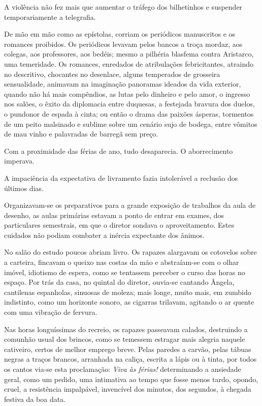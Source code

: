 A violência não fez mais que aumentar o tráfego dos bilhetinhos e
suspender temporariamente a telegrafia. 

De mão em mão como as
epístolas, corriam os periódicos manuscritos e os romances proibidos.
Os periódicos levavam pelos bancos a troça mordaz, aos colegas, aos
professores, aos bedéis; mesmo a pilhéria blasfema contra Aristarco,
uma temeridade. Os romances, enredados de atribulações febricitantes,
atraindo no descritivo, chocantes no desenlace, alguns temperados de
grosseira sensualidade, animavam na imaginação panoramas ideados da
vida exterior, quando não há mais compêndios, as lutas pelo dinheiro e
pelo amor, o ingresso nos salões, o êxito da diplomacia entre duquesas,
a festejada bravura dos duelos, o pundonor de espada à cinta; ou então
o drama das paixões ásperas, tormentos de um peito malsinado e sublime
sobre um cenário sujo de bodega, entre vômitos de mau vinho e
palavradas de barregã sem preço. 

Com a proximidade das férias de ano,
tudo desaparecia. O aborrecimento imperava. 

A impaciência da
expectativa de livramento fazia intolerável a reclusão dos últimos
dias. 

Organizavam{}-se os preparativos para a grande exposição de
trabalhos da aula de desenho, as aulas primárias estavam a ponto de
entrar em exames, dos particulares semestrais, em que o diretor sondava
o aproveitamento. Estes cuidados não podiam combater a inércia
expectante dos ânimos. 

No salão do estudo poucos abriam livro. Os
rapazes alargavam os cotovelos sobre a carteira, fincavam o queixo nas
costas da mão e abstraíam{}-se com o olhar imóvel, idiotismo de espera,
como se tentassem perceber o curso das horas no espaço. Por trás da
casa, no quintal do diretor, ouvia{}-se cantando Ângela, cantilenas
espanholas, sinuosas de moleza; mais longe, muito mais, em zumbido
indistinto, como um horizonte sonoro, as cigarras trilavam, agitando o
ar quente com uma vibração de fervura. 

Nas horas longuíssimas do
recreio, os rapazes passeavam calados, destruindo a comunhão usual dos
brincos, como se temessem estragar mais alegria naquele cativeiro,
certos de melhor emprego breve. Pelas paredes a carvão, pelas tábuas
negras a traços brancos, arranhada na caliça, escrita a lápis ou à
tinta, por todos os cantos via{}-se esta proclamação: \textit{Viva às férias!}
determinando a ansiedade geral, como um pedido, uma intimativa ao tempo
que fosse menos tardo, opondo, cruel, a resistência impalpável,
invencível dos minutos, dos segundos, à chegada festiva da boa data.

